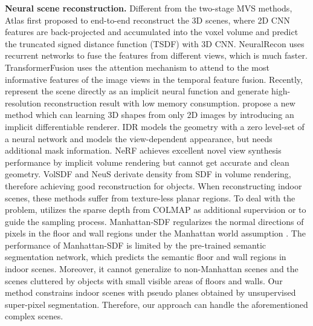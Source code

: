 \documentclass[10pt,journal,compsoc]{IEEEtran}
\begin{document}
	\noindent\textbf{Neural scene reconstruction.} Different from the two-stage MVS methods, Atlas \cite{murez2020atlas} first proposed to end-to-end reconstruct the 3D scenes, where 2D CNN features are back-projected and accumulated into the voxel volume and predict the truncated signed distance function (TSDF) with 3D CNN. NeuralRecon \cite{sun2021neuralrecon} uses recurrent networks to fuse the features from different views, which is much faster. TransformerFusion \cite{bozic2021transformerfusion} uses the attention mechanism to attend to the most informative features of the image views in the temporal feature fusion. Recently, \cite{mescheder2019occupancy, mildenhall2021nerf, yariv2021volume, oechsle2021unisurf, wang2021neus, park2019deepsdf, sitzmann2019scene, wei2021nerfingmvs} represent the scene directly as an implicit neural function and generate high-resolution reconstruction result with low memory consumption. \cite{liu2020dist,niemeyer2020differentiable} propose a new method which can learning 3D shapes from only 2D images by introducing an implicit differentiable renderer. IDR \cite{yariv2020multiview} models the geometry with a zero level-set of a neural network and models the view-dependent appearance, but needs additional mask information. NeRF \cite{mildenhall2021nerf} achieves excellent novel view synthesis performance by implicit volume rendering but cannot get accurate and clean geometry. VolSDF \cite{yariv2021volume} and NeuS \cite{wang2021neus} derivate density from SDF in volume rendering, therefore achieving good reconstruction for objects. When reconstructing indoor scenes, these methods suffer from texture-less planar regions. To deal with the problem,  \cite{deng2022depth,roessle2022dense,lin2021efficient,wei2021nerfingmvs} utilizes the sparse depth from COLMAP \cite{schonberger2016structure} as additional supervision or to guide the sampling process. Manhattan-SDF \cite{guo2022neural} regularizes the normal directions of pixels in the floor and wall regions under the Manhattan world assumption \cite{coughlan1999manhattan}. The performance of Manhattan-SDF is limited by the pre-trained semantic segmentation network, which predicts the semantic floor and wall regions in indoor scenes. Moreover, it cannot generalize to non-Manhattan scenes and the scenes cluttered by objects with small visible areas of floors and walls. Our method constrains indoor scenes with pseudo planes obtained by unsupervised super-pixel segmentation. Therefore, our approach can handle the aforementioned complex scenes.
\end{document}
